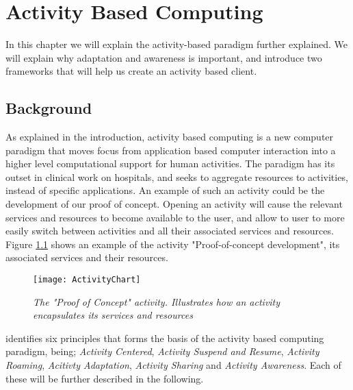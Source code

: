 \chapter{Activity Based Computing}

In this chapter we will explain the activity-based paradigm further explained. We will explain why adaptation and awareness is important, and introduce two frameworks that will help us create an activity based client.

\section{Background}
As explained in the introduction, activity based computing is a new computer paradigm that moves focus from application based computer interaction into a higher level computational support for human activities. The paradigm has its outset in clinical work on hospitals, and seeks to aggregate resources to activities, instead of specific applications. An example of such an activity could be the development of our proof of concept. Opening an activity will cause the relevant services and resources to become available to the user, and allow to user to more easily switch between activities and all their associated services and resources. Figure \ref{fig:activitychart} shows an example of the activity "Proof-of-concept development", its associated services and their resources.

\begin{figure}[h!]
  \centering
    \texttt{[image: ActivityChart]}
  \caption{\emph{The "Proof of Concept" activity. Illustrates how an activity encapsulates its services and resources}}
  \label{fig:activitychart}
\end{figure}

\citet{bardram2011} identifies six principles that forms the basis of the activity based computing paradigm, being; \emph{Activity Centered}, \emph{Activity Suspend and Resume}, \emph{Activity Roaming}, \emph{Acitivty Adaptation}, \emph{Activity Sharing} and \emph{Activity Awareness}. Each of these will be further described in the following.

